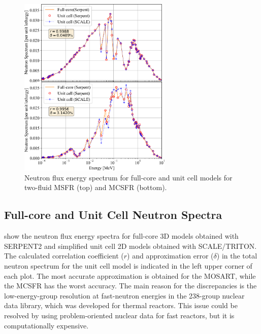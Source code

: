 \documentclass[letterpaper]{mandc2019}
\begin{document}
\begin{figure}[b!]
  \centering
  \includegraphics[width=0.65\textwidth]{./Figures/two_full_vs_unit_spectrum.png}
   \vspace{-0.05in}
  \caption{Neutron flux energy spectrum for full-core and unit cell models for two-fluid \gls{MSFR} (top) and \gls{MCSFR} (bottom).}
  \label{fig:spectrum_two}
\end{figure}

\subsection{Full-core and Unit Cell Neutron Spectra}
\label{sec:spectrum}
 show the neutron flux energy spectra for full-core 3D models obtained with SERPENT2 and simplified unit cell 2D models obtained with SCALE/TRITON. 
The calculated correlation coefficient ($r$) and approximation error ($\delta$) in the total neutron spectrum for the unit cell model is indicated in the left upper corner of each plot. 
The most accurate approximation is obtained for the \gls{MOSART}, while the \gls{MCSFR} has the worst accuracy. 
The main reason for the discrepancies is the low-energy-group resolution at fast-neutron energies in the 238-group nuclear data library, which was developed for thermal reactors. 
This issue could be resolved by using problem-oriented nuclear data for fast reactors, but it is computationally expensive.
\end{document}
